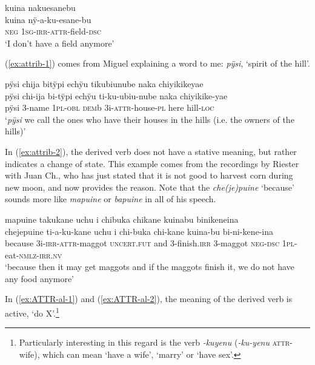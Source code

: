 \ea\label{ex:ATTR-inal-2}
\begingl
\glpreamble kuina nakuesanebu\\
\gla kuina nÿ-a-ku-esane-bu\\
\glb \textsc{neg} 1\textsc{sg}-\textsc{irr}-\textsc{attr}-field-\textsc{dsc}\\
\glft ‘I don’t have a field anymore’
\endgl
\trailingcitation{[rxx-e181017l]} %
\xe

(\ref{ex:attrib-1}) comes from Miguel explaining a word to me: \textit{pÿsi}, ‘spirit of the hill’.

\ea\label{ex:attrib-1}
\begingl
\glpreamble pÿsi chija bitÿpi echÿu tikubiunube naka chiyikikeyae\\
\gla pÿsi chi-ija bi-tÿpi echÿu ti-ku-ubiu-nube naka chiyikike-yae\\
\glb pÿsi 3-name 1\textsc{pl}-\textsc{obl} \textsc{dem}b 3i-\textsc{attr}-house-\textsc{pl} here hill-\textsc{loc}\\
\glft ‘\textit{pÿsi} we call the ones who have their houses in the hills (i.e. the owners of the hills)’
\endgl
\trailingcitation{[mxx-n151017l-1.28]}
\xe

In (\ref{ex:attrib-2}), the derived verb does not have a stative meaning, but rather indicates a change of state. This example comes from the recordings by Riester with Juan Ch., who has just stated that it is not good to harvest corn during new moon, and now provides the reason. Note that the  \textit{che(je)puine} ‘because’ sounds more like \textit{mapuine} or \textit{bapuine} in all of his speech.

\ea\label{ex:attrib-2}
\begingl
\glpreamble mapuine takukane uchu i chibuka chikane kuinabu binikeneina\\
\gla chejepuine ti-a-ku-kane uchu i chi-buka chi-kane kuina-bu bi-ni-kene-ina\\
\glb because 3i-\textsc{irr}-\textsc{attr}-maggot \textsc{uncert.fut} and 3-finish.\textsc{irr} 3-maggot \textsc{neg}-\textsc{dsc} 1\textsc{pl}-eat-\textsc{nmlz}-\textsc{irr.nv}\\
\glft ‘because then it may get maggots and if the maggots finish it, we do not have any food anymore’
\endgl
\trailingcitation{[nxx-a630101g-1.59-61]}
\xe

In (\ref{ex:ATTR-al-1}) and (\ref{ex:ATTR-al-2}), the meaning of the derived verb is active, ‘do X’.\footnote{Particularly interesting in this regard is the verb \textit{-kuyenu} (\textit{-ku-yenu} \textsc{attr}-wife), which can mean ‘have a wife’, ‘marry’ or ‘have sex’.}

